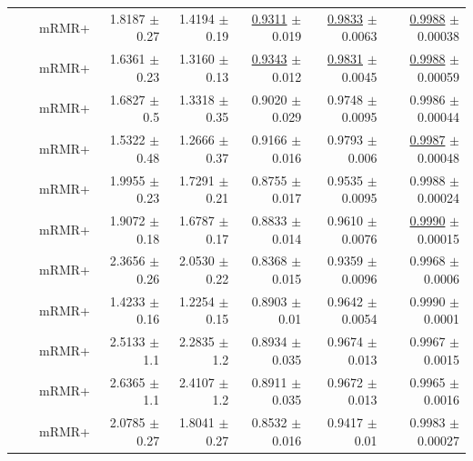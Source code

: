\begin{longtable}{llp{}rrrrr}
 &  & mRMR+ & 1.8187 {\scriptsize $\pm$ 0.27} & 1.4194 {\scriptsize $\pm$ 0.19} & \underline{0.9311} {\scriptsize $\pm$ 0.019} & \underline{0.9833} {\scriptsize $\pm$ 0.0063} & \underline{0.9988} {\scriptsize $\pm$ 0.00038} \\
 &  & mRMR+ & 1.6361 {\scriptsize $\pm$ 0.23} & 1.3160 {\scriptsize $\pm$ 0.13} & \underline{0.9343} {\scriptsize $\pm$ 0.012} & \underline{0.9831} {\scriptsize $\pm$ 0.0045} & \underline{0.9988} {\scriptsize $\pm$ 0.00059} \\
 &  & mRMR+ & 1.6827 {\scriptsize $\pm$ 0.5} & 1.3318 {\scriptsize $\pm$ 0.35} & 0.9020 {\scriptsize $\pm$ 0.029} & 0.9748 {\scriptsize $\pm$ 0.0095} & 0.9986 {\scriptsize $\pm$ 0.00044} \\
 &  & mRMR+ & 1.5322 {\scriptsize $\pm$ 0.48} & 1.2666 {\scriptsize $\pm$ 0.37} & 0.9166 {\scriptsize $\pm$ 0.016} & 0.9793 {\scriptsize $\pm$ 0.006} & \underline{0.9987} {\scriptsize $\pm$ 0.00048} \\
 &  & mRMR+ & 1.9955 {\scriptsize $\pm$ 0.23} & 1.7291 {\scriptsize $\pm$ 0.21} & 0.8755 {\scriptsize $\pm$ 0.017} & 0.9535 {\scriptsize $\pm$ 0.0095} & 0.9988 {\scriptsize $\pm$ 0.00024} \\
 &  & mRMR+ & 1.9072 {\scriptsize $\pm$ 0.18} & 1.6787 {\scriptsize $\pm$ 0.17} & 0.8833 {\scriptsize $\pm$ 0.014} & 0.9610 {\scriptsize $\pm$ 0.0076} & \underline{0.9990} {\scriptsize $\pm$ 0.00015} \\
 &  & mRMR+ & 2.3656 {\scriptsize $\pm$ 0.26} & 2.0530 {\scriptsize $\pm$ 0.22} & 0.8368 {\scriptsize $\pm$ 0.015} & 0.9359 {\scriptsize $\pm$ 0.0096} & 0.9968 {\scriptsize $\pm$ 0.0006} \\
 &  & mRMR+ & 1.4233 {\scriptsize $\pm$ 0.16} & 1.2254 {\scriptsize $\pm$ 0.15} & 0.8903 {\scriptsize $\pm$ 0.01} & 0.9642 {\scriptsize $\pm$ 0.0054} & 0.9990 {\scriptsize $\pm$ 0.0001} \\
 &  & mRMR+ & 2.5133 {\scriptsize $\pm$ 1.1} & 2.2835 {\scriptsize $\pm$ 1.2} & 0.8934 {\scriptsize $\pm$ 0.035} & 0.9674 {\scriptsize $\pm$ 0.013} & 0.9967 {\scriptsize $\pm$ 0.0015} \\
 &  & mRMR+ & 2.6365 {\scriptsize $\pm$ 1.1} & 2.4107 {\scriptsize $\pm$ 1.2} & 0.8911 {\scriptsize $\pm$ 0.035} & 0.9672 {\scriptsize $\pm$ 0.013} & 0.9965 {\scriptsize $\pm$ 0.0016} \\
 &  & mRMR+ & 2.0785 {\scriptsize $\pm$ 0.27} & 1.8041 {\scriptsize $\pm$ 0.27} & 0.8532 {\scriptsize $\pm$ 0.016} & 0.9417 {\scriptsize $\pm$ 0.01} & 0.9983 {\scriptsize $\pm$ 0.00027} \\

\end{longtable}
